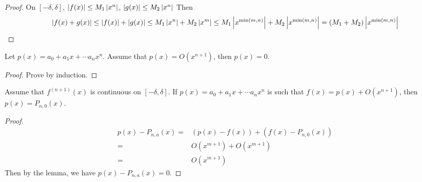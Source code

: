 \begin{proof}
On $[-\delta,\delta]$, $\left| f(x) \right| \leq M_1\left| x^n \right|$, $\left| g(x) \right| \leq M_2 \left| x^n \right|$
Then \[\left| f(x) + g(x) \right| \leq \left| f(x) \right| + \left| g(x) \right| \leq M_1 \left| x^n \right| + M_2 \left| x^m \right| \leq M_1 \left| x^{\operatorname{min} (m,n)} \right| + M_2 \left| x^{\operatorname{min} (m,n)} \right| = (M_1 + M_2) \left| x^{\operatorname{min} (m,n)} \right|\]
\end{proof}


\begin{lem}
Let $p(x) = a_0 + a_1x+ \cdots a_nx^n$. Assume that $p(x) = O(x^{n+1})$, then $p(x) = 0$.
\end{lem}

\begin{proof}
Prove by induction.
\end{proof}

\begin{thm}
Assume that $f^{(n+1)}(x)$ is continuous on $[-\delta,\delta]$. If $p(x) = a_0 + a_1x+\cdots a_nx^n$ is such that $f(x) = p(x) + O(x^{n+1})$, then $p(x) = P_{n,0}(x)$.
\end{thm}

\begin{proof}
\begin{align*}
    p(x) - P_{n,a} (x) = & (p(x) - f(x)) + (f(x) - P_{n,0}(x))\\
    = & O(x^{m+1}) + O(x^{m+1})\\
    = & O(x^{m+1})
\end{align*}
Then by the lemma, we have $p(x) - P_{n,a} (x) = 0$.
\end{proof}